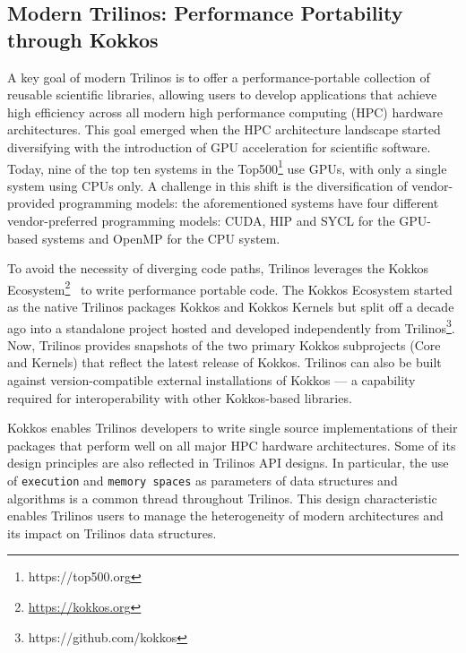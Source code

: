 \subsection{Modern Trilinos:  Performance Portability through Kokkos}


A key goal of modern Trilinos is to offer a performance-portable collection of reusable scientific libraries, allowing users to develop applications that achieve high efficiency across all modern high performance computing (HPC) hardware architectures.
This goal emerged when the HPC architecture landscape started diversifying with the
introduction of GPU acceleration for scientific software. Today, nine of the top ten systems in the Top500\footnote{https://top500.org} use GPUs, with only a single system using CPUs only. A challenge in this shift is the diversification of vendor-provided programming models: the aforementioned systems have four different vendor-preferred programming models: CUDA, HIP and SYCL for the GPU-based systems and OpenMP for the CPU system.

To avoid the necessity of diverging code paths, Trilinos leverages the Kokkos Ecosystem\footnote{\url{https://kokkos.org}}~\cite{trott2021kokkos} to write performance portable code. The Kokkos Ecosystem started as the native Trilinos packages Kokkos and Kokkos Kernels but split off a decade ago into a standalone project hosted and developed independently from Trilinos\footnote{https://github.com/kokkos}.
Now, Trilinos provides snapshots of the two primary Kokkos subprojects (Core and Kernels) that reflect the latest release of Kokkos. Trilinos can also be built against version-compatible external installations of Kokkos --- a capability required for interoperability with other Kokkos-based libraries.

Kokkos enables Trilinos developers to write single source implementations of their packages that perform well on all major HPC hardware architectures. Some of its design principles are also reflected in Trilinos API designs. In particular, the
use of \texttt{execution} and \texttt{memory spaces} as parameters of data structures and algorithms is a common thread throughout Trilinos. This design characteristic enables Trilinos users to manage the heterogeneity of modern architectures and its impact on Trilinos data structures.


